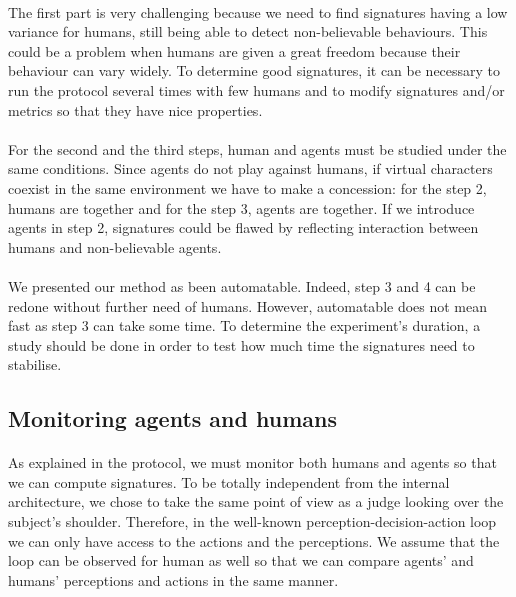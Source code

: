 \documentclass[a4paper,twocolumn]{article}
\begin{document}
\paragraph{}%
The first part is very challenging because we need to find signatures having a low variance for humans, still being able to detect non-believable behaviours. This could be a problem when humans are given a great freedom because their behaviour can vary widely. To determine good signatures, it can be necessary to run the protocol several times with few humans and to modify signatures and/or metrics so that they have nice properties.
\paragraph{}%
For the second and the third steps, human and agents must be studied under the same conditions. Since agents do not play against humans, if virtual characters coexist in the same environment we have to make a concession: for the step 2, humans are together and for the step 3, agents are together. If we introduce agents in step 2, signatures could be flawed by reflecting interaction between humans and non-believable agents.
\paragraph{}%
We presented our method as been automatable. Indeed, step 3 and 4 can be redone without further need of humans. However, automatable does not mean fast as step 3 can take some time. To determine the experiment's duration, a study should be done in order to test how much time the signatures need to stabilise.
\subsection{Monitoring agents and humans}
\paragraph{}%
As explained in the protocol, we must monitor both humans and agents so that we can compute signatures. To be totally independent from the internal architecture, we chose to take the same point of view as a judge looking over the subject's shoulder. Therefore, in the well-known perception-decision-action loop we can only have access to the actions and the perceptions. We assume that the loop can be observed for human as well so that we can compare agents' and humans' perceptions and actions in the same manner.
\end{document}
